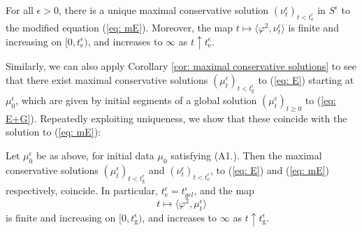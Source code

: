 \begin{lemma}\label{lemma: solution to modified equation}
    For all $\epsilon>0$, there is a unique maximal conservative solution  $(\nu^\epsilon_t)_{t< t_\mathrm{e}^\epsilon}$ in $S^\epsilon$ to the modified equation (\ref{eq: mE}). Moreover, the map $t\mapsto \langle \varphi^2, \nu^\epsilon_t\rangle$ is finite and increasing on $[0,t_\mathrm{e}^\epsilon)$, and increases to $\infty$ as $t\uparrow t_\mathrm{e}^\epsilon$. 
\end{lemma}

Similarly, we can also apply Corollary \ref{cor: maximal conservative solutions} to see that there exist maximal conservative solutions $(\mu^\epsilon_t)_{t<t_\mathrm{g}^\epsilon}$ to (\ref{eq: E}) starting at $\mu^\epsilon_0$, which are given by initial segments of a global solution $(\mu^\epsilon_t)_{t\geq 0}$ to (\ref{eq: E+G}). Repeatedly exploiting uniqueness, we show that these coincide with the solution to (\ref{eq: mE}):

\begin{lemma}\label{lemma: Relationship}
Let $\mu^\epsilon_0$ be as above, for initial data $\mu_0$ satisfying ({A1}.).  Then the maximal conservative solutions $(\mu^\epsilon_t)_{t<t_\mathrm{g}^\epsilon}$ and $(\nu^\epsilon_t)_{t<t_\mathrm{e}^\epsilon}$, to (\ref{eq: E}) and (\ref{eq: mE}) respectively, coincide. In particular, $t_\mathrm{e}^\epsilon = t^\epsilon_{gel}$, and the map \begin{equation}
    t\mapsto \langle \varphi^2, \mu^\epsilon_t\rangle
\end{equation} is finite and increasing on $[0, t_\mathrm{g}^\epsilon)$, and increases to $\infty$ as $t\uparrow t_\mathrm{g}^\epsilon.$ \end{lemma}


